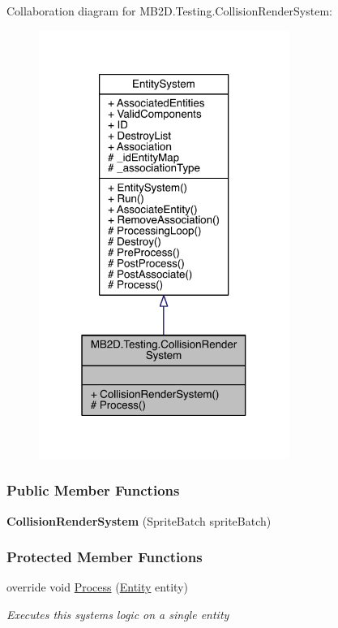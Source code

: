 Collaboration diagram for M\+B2\+D.\+Testing.\+Collision\+Render\+System\+:
\nopagebreak
\begin{figure}[H]
\begin{center}
\leavevmode
\includegraphics[width=232pt]{class_m_b2_d_1_1_testing_1_1_collision_render_system__coll__graph}
\end{center}
\end{figure}
\subsubsection*{Public Member Functions}
\begin{DoxyCompactItemize}
\item 
\hypertarget{class_m_b2_d_1_1_testing_1_1_collision_render_system_a6fc7755e518e6138a5b02f5af7d7e460}{}\label{class_m_b2_d_1_1_testing_1_1_collision_render_system_a6fc7755e518e6138a5b02f5af7d7e460} 
{\bfseries Collision\+Render\+System} (Sprite\+Batch sprite\+Batch)
\end{DoxyCompactItemize}
\subsubsection*{Protected Member Functions}
\begin{DoxyCompactItemize}
\item 
override void \hyperlink{class_m_b2_d_1_1_testing_1_1_collision_render_system_af7b7ffdb316533a084e98cbea97a096f}{Process} (\hyperlink{class_m_b2_d_1_1_entity_component_1_1_entity}{Entity} entity)
\begin{DoxyCompactList}\small\item\em Executes this systems logic on a single entity \end{DoxyCompactList}\end{DoxyCompactItemize}
